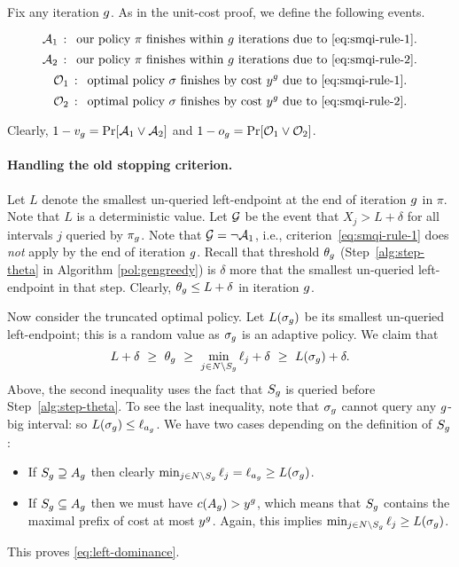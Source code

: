 \documentclass[11pt]{article}
\theoremstyle{remark}
\theoremstyle{plain}
\theoremstyle{remark}
\begin{document}
Fix any iteration $g$. As in the unit-cost \smqi proof, we define the following events.


$$ {\cal A}_1 \,:\, \text{    our policy $\pi$   finishes within $g$ iterations due to~\eqref{eq:smqi-rule-1}.}$$
$$ {\cal A}_2 \,:\, \text{    our policy $\pi$   finishes within $g$ iterations due to~\eqref{eq:smqi-rule-2}.}$$
$$ {\cal O}_1 \,:\, \text{    optimal policy $\sigma$   finishes by  cost $y^g$  due to~\eqref{eq:smqi-rule-1}.}$$
$$ {\cal O}_2 \,:\, \text{    optimal policy $\sigma$   finishes  by  cost $y^g$  due to~\eqref{eq:smqi-rule-2}.}$$

Clearly, $1-v_g = \Pr[{\cal A}_1\vee {\cal A}_2]$ and $1-o_g = \Pr[{\cal O}_1\vee {\cal O}_2]$. 

\paragraph{Handling the old stopping criterion.}
Let $L$ denote the smallest un-queried left-endpoint at the end of iteration $g$ in $\pi$.  Note that $L$ is a deterministic value. Let  
${\cal G}$ be the event that $X_j > L+\delta$ for all intervals $j$  queried by $\pi_g$.  Note that ${\cal G}=\neg {\cal A}_1$, i.e., criterion~\eqref{eq:smqi-rule-1} does {\em not} apply by the end of iteration $g$. 
Recall that threshold $\theta_g$ (Step~\ref{alg:step-theta} in Algorithm \ref{pol:gengreedy})  is $\delta$ more that the smallest un-queried left-endpoint in that step. Clearly,  $\theta_g \le L+\delta$ in iteration $g$.


Now consider the truncated optimal policy. Let $L(\sigma_g)$ be its smallest un-queried left-endpoint; this is a random value as $\sigma_g$ is an adaptive policy. We claim that 
\begin{equation}
    \label{eq:left-dominance}
    L+\delta \,\, \ge  \,\,\theta_g \,\, \ge  \,\,\min_{j\in N\setminus S_g} \ell_j  +\delta  \,\,\ge  \,\,L(\sigma_g) +\delta.
\end{equation}
Above,  the second inequality uses the fact that $S_g$ is queried before Step~\ref{alg:step-theta}.  To see the last  inequality, note that  $\sigma_g$ cannot query any $g$-big interval: so  $L(\sigma_g)\le \ell_{a_g}$.  We have two cases depending on the definition of $S_g$:
\begin{itemize}
    \item If $S_g\supseteq A_g$ then clearly $\min_{j\in N\setminus S_g} \ell_j = \ell_{a_g} \ge L(\sigma_g)$. 
    \item If $S_g\subseteq A_g$ then we must have $c(A_g)>y^g$, which means that $S_g$ contains the maximal prefix of cost at most $y^g$. Again, this implies $\min_{j\in N\setminus S_g} \ell_j \ge  L(\sigma_g)$.
\end{itemize}
This proves \eqref{eq:left-dominance}. 
\end{document}
